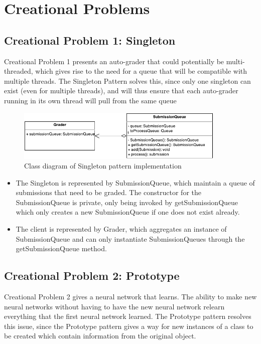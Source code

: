 \documentclass[11pt]{article}
\begin{document}
\newpage
\section{Creational Problems}
\subsection{Creational Problem 1: Singleton}

Creational Problem 1 presents an auto-grader that could potentially be 
multi-threaded, which gives rise to the need for a queue that will be compatible
with multiple threads. The Singleton Pattern solves this, since only one 
singleton can exist (even for multiple threads), and will thus ensure that each
auto-grader running in its own thread will pull from the same queue

\begin{figure}[!htb]
  \begin{center}
    \includegraphics[width=100mm]{Singleton.pdf}
    \caption{Class diagram of Singleton pattern implementation}
    \label{fig:singleton}
  \end{center} 
\end{figure}

\begin{itemize}
\item The Singleton is represented by {\ttfamily SubmissionQueue}, which 
  maintain a queue of submissions that need to be graded. The constructor for 
  the SubmissionQueue is private, only being invoked by 
  {\ttfamily getSubmissionQueue} which only creates a new 
  {\ttfamily SubmissionQueue} if one does not exist already.
\item The client is represented by {\ttfamily Grader}, which aggregates an
  instance of {\ttfamily SubmissionQueue} and can only instantiate
  SubmissionQueues through the {\ttfamily getSubmissionQueue} method.
\end{itemize}

\newpage
\subsection{Creational Problem 2: Prototype}

Creational Problem 2 gives a neural network that learns. The ability to make new
neural networks without having to have the new neural network relearn everything
that the first neural network learned. The Prototype pattern resolves this 
issue, since the Prototype pattern gives a way for new instances of a class to 
be created which contain information from the original object.
\end{document}
